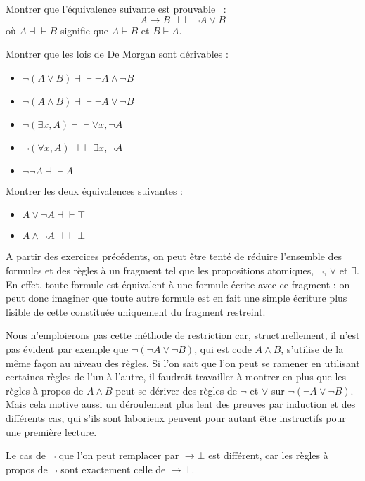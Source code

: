 \begin{exercise}
  Montrer que l'équivalence suivante est prouvable~ :
  \[A \to B \dashv\vdash \lnot A \lor B\]
  où $A \dashv\vdash B$ signifie que $A\vdash B$ et $B\vdash A$.
\end{exercise}

\begin{exercise}[De Morgan]
  Montrer que les lois de De Morgan sont dérivables :
  \begin{itemize}
  \item $\lnot (A \lor B) \dashv\vdash \lnot A \land \lnot B$
  \item $\lnot (A \land B) \dashv\vdash \lnot A \lor \lnot B$
  \item $\lnot (\exists x, A) \dashv\vdash \forall x, \lnot A$
  \item $\lnot (\forall x, A) \dashv\vdash \exists x, \lnot A$
  \item $\lnot\lnot A \dashv\vdash A$
  \end{itemize}
\end{exercise}

\begin{exercise}
  Montrer les deux équivalences suivantes :
  \begin{itemize}
  \item $A \lor \lnot A \dashv\vdash \top$
  \item $A \land \lnot A \dashv\vdash \bot$
  \end{itemize}
\end{exercise}

\begin{remark}
  A partir des exercices précédents, on peut être tenté de réduire l'ensemble
  des formules et des règles à un fragment tel que les propositions atomiques,
  $\lnot$, $\lor$ et $\exists$. En effet, toute formule est équivalent à une
  formule écrite avec ce fragment : on peut donc imaginer que toute autre
  formule est en fait une simple écriture plus lisible de cette constituée
  uniquement du fragment restreint.

  Nous n'emploierons pas cette méthode de restriction car, structurellement,
  il n'est pas évident par exemple que $\lnot (\lnot A \lor \lnot B)$, qui
  est code $A \land B$, s'utilise de la même façon au niveau des règles. Si l'on
  sait que l'on peut se ramener en utilisant certaines règles de l'un à l'autre,
  il faudrait travailler à montrer en plus que les règles à propos de $A\land B$
  peut se dériver des règles de $\lnot$ et $\lor$ sur
  $\lnot (\lnot A \lor \lnot B)$. Mais cela motive aussi un déroulement plus
  lent des preuves par induction et des différents cas, qui s'ils sont
  laborieux peuvent pour autant être instructifs pour une première lecture.

  Le cas de $\lnot$ que l'on peut remplacer par $\to \bot$ est différent, car
  les règles à propos de $\lnot$ sont exactement celle de $\to \bot$.
\end{remark}


